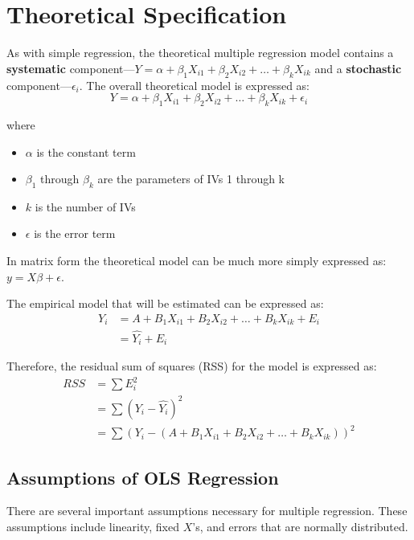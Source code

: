 \documentclass[11pt,openany]{book}\usepackage[]{graphicx}\usepackage[]{color}
\begin{document}
\section{Theoretical Specification}

As with simple regression, the theoretical multiple regression model contains a \textbf{systematic} component---$Y = \alpha + \beta_{1}
X_{i1}+\beta_{2} X_{i2}+\ldots+\beta_{k} X_{ik}$ and a \textbf{stochastic} component---$\epsilon_{i}$. The overall theoretical model is expressed as: 
\begin{equation*}
Y = \alpha + \beta_{1} X_{i1}+\beta_{2} X_{i2}+\ldots+\beta_{k} X_{ik}+\epsilon_{i}
\end{equation*}

\noindent where
\begin{itemize}
\item $\alpha$ is the constant term 
\item $\beta_{1}$ through $\beta_{k}$ are the parameters of IVs 1 through k 
\item $k$ is the number of IVs
\item $\epsilon$ is the error term  
\end{itemize}

\noindent In matrix form the theoretical model can be much more simply expressed as: 
$y = X\beta+\epsilon$.

\noindent The empirical model that will be estimated can be expressed as: 
\begin{align*}
 Y_{i} &= A+B_{1}X_{i1}+B_{2}X_{i2}+\ldots+B_{k}X_{ik}+E_{i} \\
 &= \hat{Y_{i}}+E_{i}
\end{align*}

\noindent Therefore, the residual sum of squares (RSS) for the model is expressed as: 
\begin{align*}
RSS &= \sum E^{2}_{i} \\
&= \sum(Y_{i}-\hat{Y_{i}})^{2} \\
&= \sum(Y_{i}-(A+B_{1}X_{i1}+B_{2}X_{i2}+\ldots+B_{k}X_{ik}))^{2} 
\end{align*}

\subsection{Assumptions of OLS Regression} 

There are several important assumptions necessary for multiple regression. These
assumptions include linearity, fixed $X$'s, and errors that are normally distributed.
\end{document}
